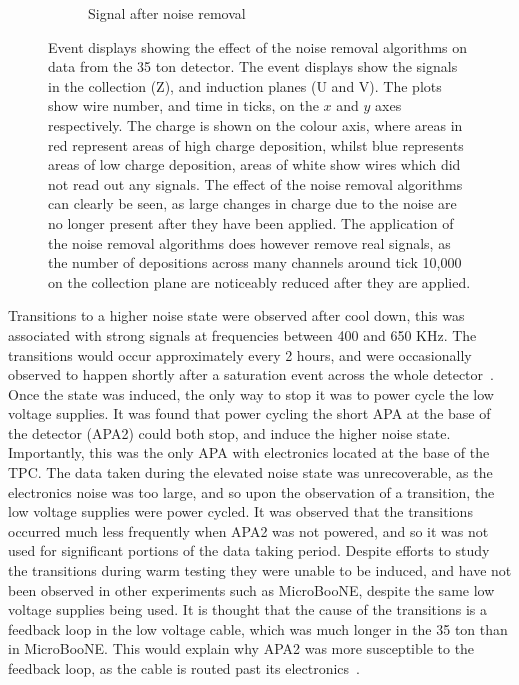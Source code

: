 \begin{figure}
\begin{subfigure}{0.55\textwidth}
    \caption{Signal after noise removal}
    \label{fig:NoiseRemoval_Mit}
  \end{subfigure}
  \caption[The effect of noise removal algorithms in the 35 ton data]
          {Event displays showing the effect of the noise removal algorithms on data from the 35 ton detector. The event displays show the signals in the collection (Z), and induction planes (U and V). The plots show wire number, and time in ticks, on the $x$ and $y$ axes respectively. The charge is shown on the colour axis, where areas in red represent areas of high charge deposition, whilst blue represents areas of low charge deposition, areas of white show wires which did not read out any signals. The effect of the noise removal algorithms can clearly be seen, as large changes in charge due to the noise are no longer present after they have been applied. The application of the noise removal algorithms does however remove real signals, as the number of depositions across many channels around tick 10,000 on the collection plane are noticeably reduced after they are applied.}
  \label{fig:NoiseRemoval}
\end{figure}

Transitions to a higher noise state were observed after cool down, this was associated with strong signals at frequencies between 400 and 650 KHz. The transitions would occur approximately every 2 hours, and were occasionally observed to happen shortly after a saturation event across the whole detector~\citep{35tonNoiseMeeting}. Once the state was induced, the only way to stop it was to power cycle the low voltage supplies. It was found that power cycling the short APA at the base of the detector (APA2) could both stop, and induce the higher noise state. Importantly, this was the only APA with electronics located at the base of the TPC. The data taken during the elevated noise state was unrecoverable, as the electronics noise was too large, and so upon the observation of a transition, the low voltage supplies were power cycled. It was observed that the transitions occurred much less frequently when APA2 was not powered, and so it was not used for significant portions of the data taking period. Despite efforts to study the transitions during warm testing they were unable to be induced, and have not been observed in other experiments such as MicroBooNE, despite the same low voltage supplies being used. It is thought that the cause of the transitions is a feedback loop in the low voltage cable, which was much longer in the 35 ton than in MicroBooNE. This would explain why APA2 was more susceptible to the feedback loop, as the cable is routed past its electronics~\citep{35tonNoiseDoc}.

